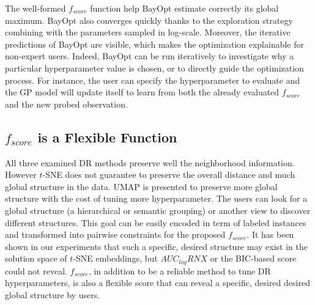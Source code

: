 The well-formed $f_{score}$ function help BayOpt estimate correctly its global maximum.
BayOpt also converges quickly thanks to the exploration strategy combining with the parameters sampled in log-scale.
Moreover, the iterative predictions of BayOpt are visible, which makes the optimization explainable for non-expert users.
Indeed, BayOpt can be run iteratively to investigate why a particular hyperparameter value is chosen, or to directly guide the optimization process. For instance, the user can specify the hyperparameter to evaluate and the GP model will update itself to learn from both the already evaluated $f_{score}$ and the new probed observation.

\subsection{$f_{score}$ is a Flexible Function}
All three examined DR methods preserve well the neighborhood information.
However $t$-SNE does not guarantee to preserve the overall distance and much global structure in the data.
UMAP is presented to preserve more global structure with the cost of tuning more hyperparameter.
The users can look for a global structure (a hierarchical or semantic grouping) or another view to discover different structures.
This goal can be easily encoded in term of labeled instances and transformed into pairwise constraints for the proposed $f_{score}$.
It has been shown in our experiments that such a specific, desired structure may exist in the solution space of $t$-SNE embeddings, but $AUC_{log}RNX$ or the BIC-based score could not reveal.
$f_{score}$, in addition to be a reliable method to tune DR hyperparameters, is also a flexible score that can reveal a specific, desired desired global structure by users.

